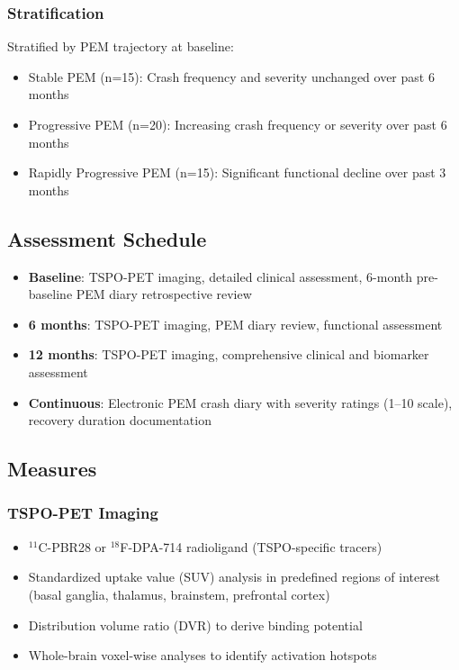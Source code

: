 \subsubsection{Stratification}
Stratified by PEM trajectory at baseline:
\begin{itemize}
    \item Stable PEM (n=15): Crash frequency and severity unchanged over past 6 months
    \item Progressive PEM (n=20): Increasing crash frequency or severity over past 6 months
    \item Rapidly Progressive PEM (n=15): Significant functional decline over past 3 months
\end{itemize}

\subsection{Assessment Schedule}

\begin{itemize}
    \item \textbf{Baseline}: TSPO-PET imaging, detailed clinical assessment, 6-month pre-baseline PEM diary retrospective review
    \item \textbf{6 months}: TSPO-PET imaging, PEM diary review, functional assessment
    \item \textbf{12 months}: TSPO-PET imaging, comprehensive clinical and biomarker assessment
    \item \textbf{Continuous}: Electronic PEM crash diary with severity ratings (1--10 scale), recovery duration documentation
\end{itemize}

\subsection{Measures}

\subsubsection{TSPO-PET Imaging}
\begin{itemize}
    \item $^{11}$C-PBR28 or $^{18}$F-DPA-714 radioligand (TSPO-specific tracers)
    \item Standardized uptake value (SUV) analysis in predefined regions of interest (basal ganglia, thalamus, brainstem, prefrontal cortex)
    \item Distribution volume ratio (DVR) to derive binding potential
    \item Whole-brain voxel-wise analyses to identify activation hotspots
\end{itemize}

